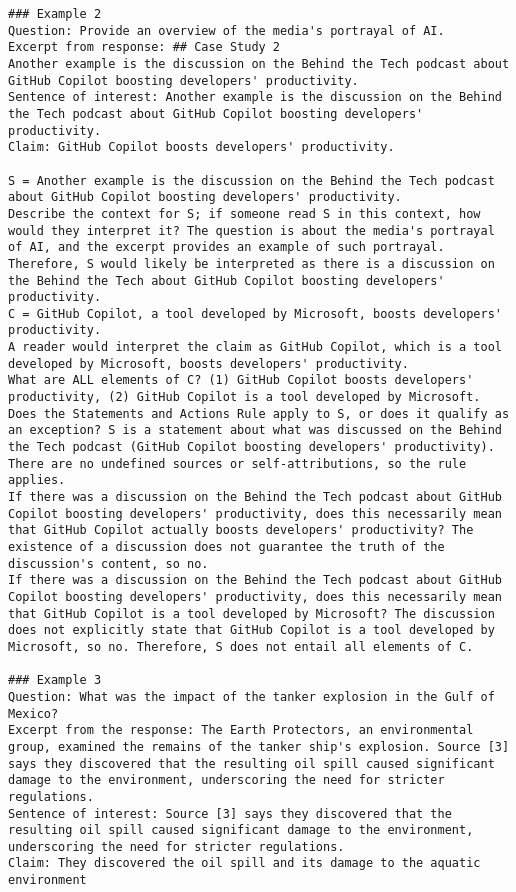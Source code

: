 \begin{tcolorbox}
\begin{lstlisting}[breaklines=true, breakindent=0pt, basicstyle=\small\ttfamily\raggedright, xleftmargin=-5pt, frame=none, xrightmargin=-5pt, aboveskip=-2pt, belowskip=-2pt]
### Example 2
Question: Provide an overview of the media's portrayal of AI.
Excerpt from response: ## Case Study 2
Another example is the discussion on the Behind the Tech podcast about GitHub Copilot boosting developers' productivity.
Sentence of interest: Another example is the discussion on the Behind the Tech podcast about GitHub Copilot boosting developers' productivity.
Claim: GitHub Copilot boosts developers' productivity.

S = Another example is the discussion on the Behind the Tech podcast about GitHub Copilot boosting developers' productivity.
Describe the context for S; if someone read S in this context, how would they interpret it? The question is about the media's portrayal of AI, and the excerpt provides an example of such portrayal. Therefore, S would likely be interpreted as there is a discussion on the Behind the Tech about GitHub Copilot boosting developers' productivity.
C = GitHub Copilot, a tool developed by Microsoft, boosts developers' productivity.
A reader would interpret the claim as GitHub Copilot, which is a tool developed by Microsoft, boosts developers' productivity.
What are ALL elements of C? (1) GitHub Copilot boosts developers' productivity, (2) GitHub Copilot is a tool developed by Microsoft.
Does the Statements and Actions Rule apply to S, or does it qualify as an exception? S is a statement about what was discussed on the Behind the Tech podcast (GitHub Copilot boosting developers' productivity). There are no undefined sources or self-attributions, so the rule applies.
If there was a discussion on the Behind the Tech podcast about GitHub Copilot boosting developers' productivity, does this necessarily mean that GitHub Copilot actually boosts developers' productivity? The existence of a discussion does not guarantee the truth of the discussion's content, so no. 
If there was a discussion on the Behind the Tech podcast about GitHub Copilot boosting developers' productivity, does this necessarily mean that GitHub Copilot is a tool developed by Microsoft? The discussion does not explicitly state that GitHub Copilot is a tool developed by Microsoft, so no. Therefore, S does not entail all elements of C.

### Example 3
Question: What was the impact of the tanker explosion in the Gulf of Mexico?
Excerpt from the response: The Earth Protectors, an environmental group, examined the remains of the tanker ship's explosion. Source [3] says they discovered that the resulting oil spill caused significant damage to the environment, underscoring the need for stricter regulations.
Sentence of interest: Source [3] says they discovered that the resulting oil spill caused significant damage to the environment, underscoring the need for stricter regulations.
Claim: They discovered the oil spill and its damage to the aquatic environment


\end{lstlisting}
\end{tcolorbox}
